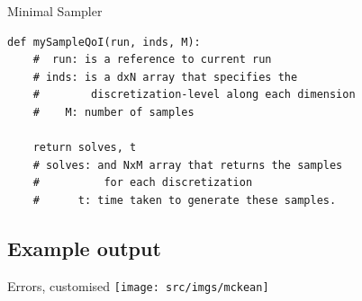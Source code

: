 


\begin{frame}[fragile]{Minimal Sampler}
\begin{verbatim}
def mySampleQoI(run, inds, M):
    #  run: is a reference to current run
    # inds: is a dxN array that specifies the
    #        discretization-level along each dimension
    #    M: number of samples

    return solves, t
    # solves: and NxM array that returns the samples
    #          for each discretization
    #      t: time taken to generate these samples.
\end{verbatim}
\end{frame}

\subsection{Example output}
\begin{frame}{Errors, customised}\centering
  \texttt{[image: src/imgs/mckean]}
\end{frame}


